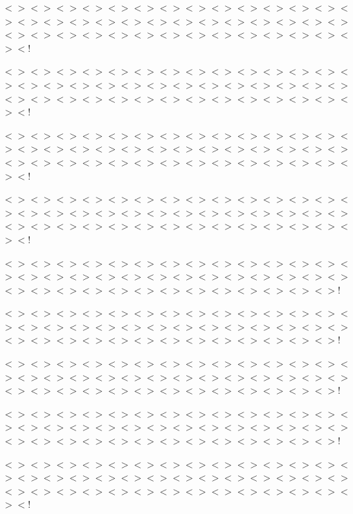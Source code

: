 $<$$>$$<$$>$$<$$>$$<$$>$$<$$>$$<$$>$$<$$>$$<$$>$$<$$>$$<$$>$$<$$>$$<$$>$$<$$>$$<$$>$$<$$>$$<$$>$$<$$>$$<$$>$$<$$>$$<$$>$$<$$>$$<$$>$$<$$>$$<$$>$$<$$>$$<$$>$$<$$>$$<$$>$$<$$>$$<$$>$$<$$>$$<$$>$$<$$>$$<$$>$$<$$>$$<$$>$$<$$>$$<$$>$$<$$>$$<$$>$$<$$>$$<$!

$<$$>$$<$$>$$<$$>$$<$$>$$<$$>$$<$$>$$<$$>$$<$$>$$<$$>$$<$$>$$<$$>$$<$$>$$<$$>$$<$$>$$<$$>$$<$$>$$<$$>$$<$$>$$<$$>$$<$$>$$<$$>$$<$$>$$<$$>$$<$$>$$<$$>$$<$$>$$<$$>$$<$$>$$<$$>$$<$$>$$<$$>$$<$$>$$<$$>$$<$$>$$<$$>$$<$$>$$<$$>$$<$$>$$<$$>$$<$$>$$<$$>$$<$!

$<$$>$$<$$>$$<$$>$$<$$>$$<$$>$$<$$>$$<$$>$$<$$>$$<$$>$$<$$>$$<$$>$$<$$>$$<$$>$$<$$>$$<$$>$$<$$>$$<$$>$$<$$>$$<$$>$$<$$>$$<$$>$$<$$>$$<$$>$$<$$>$$<$$>$$<$$>$$<$$>$$<$$>$$<$$>$$<$$>$$<$$>$$<$$>$$<$$>$$<$$>$$<$$>$$<$$>$$<$$>$$<$$>$$<$$>$$<$$>$$<$$>$$<$!

$<$$>$$<$$>$$<$$>$$<$$>$$<$$>$$<$$>$$<$$>$$<$$>$$<$$>$$<$$>$$<$$>$$<$$>$$<$$>$$<$$>$$<$$>$$<$$>$$<$$>$$<$$>$$<$$>$$<$$>$$<$$>$$<$$>$$<$$>$$<$$>$$<$$>$$<$$>$$<$$>$$<$$>$$<$$>$$<$$>$$<$$>$$<$$>$$<$$>$$<$$>$$<$$>$$<$$>$$<$$>$$<$$>$$<$$>$$<$$>$$<$$>$$<$!

$<$$>$$<$$>$$<$$>$$<$$>$$<$$>$$<$$>$$<$$>$$<$$>$$<$$>$$<$$>$$<$$>$$<$$>$$<$$>$$<$$>$$<$$>$$<$$>$$<$$>$$<$$>$$<$$>$$<$$>$$<$$>$$<$$>$$<$$>$$<$$>$$<$$>$$<$$>$$<$$>$$<$$>$$<$$>$$<$$>$$<$$>$$<$$>$$<$$>$$<$$>$$<$$>$$<$$>$$<$$>$$<$$>$$<$$>$$<$$>$!

$<$$>$$<$$>$$<$$>$$<$$>$$<$$>$$<$$>$$<$$>$$<$$>$$<$$>$$<$$>$$<$$>$$<$$>$$<$$>$$<$$>$$<$$>$$<$$>$$<$$>$$<$$>$$<$$>$$<$$>$$<$$>$$<$$>$$<$$>$$<$$>$$<$$>$$<$$>$$<$$>$$<$$>$$<$$>$$<$$>$$<$$>$$<$$>$$<$$>$$<$$>$$<$$>$$<$$>$$<$$>$$<$$>$$<$$>$$<$$>$!

$<$$>$$<$$>$$<$$>$$<$$>$$<$$>$$<$$>$$<$$>$$<$$>$$<$$>$$<$$>$$<$$>$$<$$>$$<$$>$$<$$>$$<$$>$$<$$>$$<$$>$$<$$>$$<$$>$$<$$>$$<$$>$$<$$>$$<$$>$$<$$>$$<$$>$$<$$>$$<$$>$$<$$>$$<$$>$$<$$>$$<$$>$$<$$>$$<$$>$$<$$>$$<$$>$$<$$>$$<$$>$$<$$>$$<$$>$$<$$>$!

$<$$>$$<$$>$$<$$>$$<$$>$$<$$>$$<$$>$$<$$>$$<$$>$$<$$>$$<$$>$$<$$>$$<$$>$$<$$>$$<$$>$$<$$>$$<$$>$$<$$>$$<$$>$$<$$>$$<$$>$$<$$>$$<$$>$$<$$>$$<$$>$$<$$>$$<$$>$$<$$>$$<$$>$$<$$>$$<$$>$$<$$>$$<$$>$$<$$>$$<$$>$$<$$>$$<$$>$$<$$>$$<$$>$$<$$>$$<$$>$!

$<$$>$$<$$>$$<$$>$$<$$>$$<$$>$$<$$>$$<$$>$$<$$>$$<$$>$$<$$>$$<$$>$$<$$>$$<$$>$$<$$>$$<$$>$$<$$>$$<$$>$$<$$>$$<$$>$$<$$>$$<$$>$$<$$>$$<$$>$$<$$>$$<$$>$$<$$>$$<$$>$$<$$>$$<$$>$$<$$>$$<$$>$$<$$>$$<$$>$$<$$>$$<$$>$$<$$>$$<$$>$$<$$>$$<$$>$$<$$>$$<$$>$$<$!

